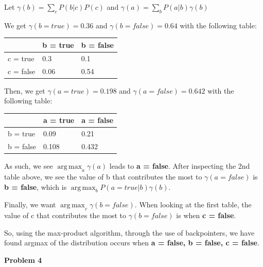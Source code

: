 \documentclass[12pt]{article}
\DeclareMathOperator*{\argmax}{arg\,max}
\begin{document}
Let $\gamma(b) = \sum_c P(b\vert c)P(c)$ and $\gamma(a) = \sum_b P(a \vert b)\gamma(b)$

We get $\gamma(b = true) = 0.36$ and $\gamma(b = false) = 0.64$ with the following table:

\begin{table}[h]
	\begin{tabular}{|l|l|l|}
		\hline
		& b = true & b = false \\ \hline
		c = true  & 0.3      & 0.1       \\ \hline
		c = false & 0.06     & 0.54      \\ \hline
	\end{tabular}
\end{table}

Then, we get $\gamma(a = true) = 0.198$ and $\gamma(a = false) = 0.642$ with the following table:

\begin{table}[h]
	\begin{tabular}{|l|l|l|}
		\hline
		& a = true & a = false \\ \hline
		b = true  & 0.09      & 0.21       \\ \hline
		b = false & 0.108     & 0.432      \\ \hline
	\end{tabular}
\end{table}

As such, we see $\argmax_a \gamma(a)$ leads to \textbf{a = false}. After inspecting the 2nd table above, we see the value of b that contributes the most to $\gamma(a = false)$ is \textbf{b = false}, which is $\argmax_b P(a = true \vert b)\gamma(b)$.

Finally, we want $\argmax_c \gamma(b = false)$. When looking at the first table, the value of c that contributes the most to $\gamma(b = false)$ is when \textbf{c = false}.

So, using the max-product algorithm, through the use of backpointers, we have found argmax of the distribution occurs when \textbf{a = false, b = false, c = false}.

\pagebreak\textbf{Problem 4}
\end{document}
